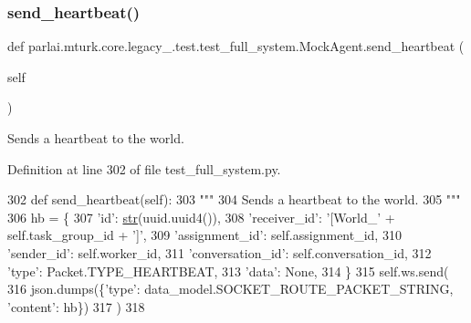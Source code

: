 \subsubsection{\texorpdfstring{send\+\_\+heartbeat()}{send\_heartbeat()}}
{\footnotesize\ttfamily def parlai.\+mturk.\+core.\+legacy\+\_.\+test.\+test\+\_\+full\+\_\+system.\+Mock\+Agent.\+send\+\_\+heartbeat (\begin{DoxyParamCaption}\item[{}]{self }\end{DoxyParamCaption})}

\begin{DoxyVerb}Sends a heartbeat to the world.
\end{DoxyVerb}
 

Definition at line 302 of file test\+\_\+full\+\_\+system.\+py.


\begin{DoxyCode}
302     \textcolor{keyword}{def }send\_heartbeat(self):
303         \textcolor{stringliteral}{"""}
304 \textcolor{stringliteral}{        Sends a heartbeat to the world.}
305 \textcolor{stringliteral}{        """}
306         hb = \{
307             \textcolor{stringliteral}{'id'}: \hyperlink{namespacegenerate__task__READMEs_a5b88452ffb87b78c8c85ececebafc09f}{str}(uuid.uuid4()),
308             \textcolor{stringliteral}{'receiver\_id'}: \textcolor{stringliteral}{'[World\_'} + self.task\_group\_id + \textcolor{stringliteral}{']'},
309             \textcolor{stringliteral}{'assignment\_id'}: self.assignment\_id,
310             \textcolor{stringliteral}{'sender\_id'}: self.worker\_id,
311             \textcolor{stringliteral}{'conversation\_id'}: self.conversation\_id,
312             \textcolor{stringliteral}{'type'}: Packet.TYPE\_HEARTBEAT,
313             \textcolor{stringliteral}{'data'}: \textcolor{keywordtype}{None},
314         \}
315         self.ws.send(
316             json.dumps(\{\textcolor{stringliteral}{'type'}: data\_model.SOCKET\_ROUTE\_PACKET\_STRING, \textcolor{stringliteral}{'content'}: hb\})
317         )
318 
\end{DoxyCode}
\mbox{\label{classparlai_1_1mturk_1_1core_1_1legacy__2018_1_1test_1_1test__full__system_1_1MockAgent_aceba268d9ab171f424784262542bbd0d}} 
